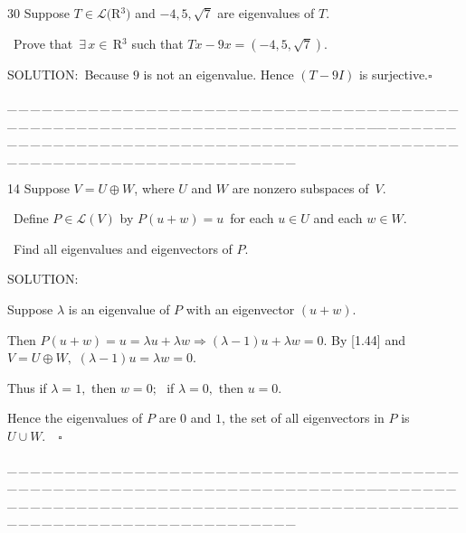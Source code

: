 \documentclass[a4paper, 11pt, UTF8]{article}
\def\Lm{\mathcal{L}}
\def\Rbfc{$\,{\timesbf R}$}
\begin{document}
\begin{large}
{\timesbf\Large 30} {\timessl\Large 
Suppose $T\in\Lm(${\timesbf R}$^3)$ and $-4,5,\sqrt{7}$ are eigenvalues of $T$.}\par\quad\,
{\timessl\Large Prove that $\,\exists\,x\in\Rbfc^3$ such that $Tx - 9x = (-4, 5, \sqrt{7})$.}\par
{\timesbf S\footnotesize{OLUTION:}}\,\,\,Because $9$ is not an eigenvalue. Hence $(T-9I)$ is surjective.\quad$\square$\par
{\tiny \_\,\_\,\_\,\_\,\_\,\_\,\_\,\_\,\_\,\_\,\_\,\_\,\_\,\_\,\_\,\_\,\_\,\_\,\_\,\_\,\_\,\_\,\_\,\_\,\_\,\_\,\_\,\_\,\_\,\_\,\_\,\_\,\_\,\_\,\_\,\_\,\_\,\_\,\_\,\_\,\_\,\_\,\_\,\_\,\_\,\_\,\_\,\_\,\_\,\_\,\_\,\_\,\_\,\_\,\_\,\_\,\_\,\_\,\_\,\_\,\_\,\_\,\_\,\_\,\_\,\_\,\_\,\_\,\_\,\_\,\_\_\,\_\,\_\,\_\,\_\,\_\,\_\,\_\,\_\,\_\,\_\,\_\,\_\,\_\,\_\,\_\,\_\,\_\,\_\,\_\,\_\,\_\,\_\,\_\,\_\,\_\,\_\,\_\,\_\,\_\,\_\,\_\,\_\,\_\,\_\,\_\,\_\,\_\,\_\,\_\,\_\,\_\,\_\,\_\,\_\,\_\,\_\,\_\,\_\,\_\,\_\,\_\,\_\,\_\,\_\,\_\,\_\,\_\,\_\,\_\,\_\,\_\,\_\,\_\,\_\,\_\,\_\,\_\,\_\,\_\,\_}\par


{\timesbf\Large 14} {\timessl\Large 
Suppose $V = U\oplus W$, where $U$ and $W$ are nonzero subspaces of \,$V$.}\par\quad\,
{\timessl\Large Define $P\in\Lm(V)$ by $P(u + w) = u$ \,for each $u\in U$ and each $w\in W$.}\par\quad\,
{\timessl\Large
 Find all eigenvalues and eigenvectors of $P$.
}\par
{\timesbf S\footnotesize{OLUTION:}}\par\quad
Suppose $\lambda$ is an eigenvalue of $P$ with an eigenvector $(u+w).$\par\quad
Then $P(u+w)=u=\lambda u+\lambda w\Rightarrow(\lambda-1)u+\lambda w=0.$ By [1.44] and $V=U\oplus W,$ $(\lambda-1)u=\lambda w=0.$\par\quad
Thus if $\lambda=1,$ then $w=0;$\,\, if $\lambda=0,$ then $u=0.$\par\quad
Hence the eigenvalues of $P$ are $0$ and $1$, the set of all eigenvectors in $P$ is $U\cup W.\quad\square$\par
{\tiny \_\,\_\,\_\,\_\,\_\,\_\,\_\,\_\,\_\,\_\,\_\,\_\,\_\,\_\,\_\,\_\,\_\,\_\,\_\,\_\,\_\,\_\,\_\,\_\,\_\,\_\,\_\,\_\,\_\,\_\,\_\,\_\,\_\,\_\,\_\,\_\,\_\,\_\,\_\,\_\,\_\,\_\,\_\,\_\,\_\,\_\,\_\,\_\,\_\,\_\,\_\,\_\,\_\,\_\,\_\,\_\,\_\,\_\,\_\,\_\,\_\,\_\,\_\,\_\,\_\,\_\,\_\,\_\,\_\,\_\,\_\_\,\_\,\_\,\_\,\_\,\_\,\_\,\_\,\_\,\_\,\_\,\_\,\_\,\_\,\_\,\_\,\_\,\_\,\_\,\_\,\_\,\_\,\_\,\_\,\_\,\_\,\_\,\_\,\_\,\_\,\_\,\_\,\_\,\_\,\_\,\_\,\_\,\_\,\_\,\_\,\_\,\_\,\_\,\_\,\_\,\_\,\_\,\_\,\_\,\_\,\_\,\_\,\_\,\_\,\_\,\_\,\_\,\_\,\_\,\_\,\_\,\_\,\_\,\_\,\_\,\_\,\_\,\_\,\_\,\_\,\_}\par



\end{large}
\end{document}
